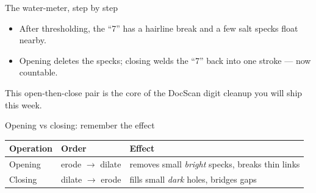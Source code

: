 \documentclass[10pt,aspectratio=169]{beamer}
\begin{document}
\begin{frame}{The water-meter, step by step}
  \begin{center}
  \end{center}
  \begin{itemize}
    \item After thresholding, the ``7'' has a hairline break and a few salt specks float nearby.
    \item Opening deletes the specks; closing welds the ``7'' back into one stroke — now countable.
  \end{itemize}
  \begin{goodbox}
    This open-then-close pair is the core of the DocScan digit cleanup you will ship this week.
  \end{goodbox}
\end{frame}

\begin{frame}{Opening vs closing: remember the effect}
  \begin{center}
  \begin{tabular}{@{}lll@{}}
    \toprule
    \textbf{Operation} & \textbf{Order} & \textbf{Effect} \\
    \midrule
    Opening & erode $\rightarrow$ dilate & removes small \emph{bright} specks, breaks thin links \\
    Closing & dilate $\rightarrow$ erode & fills small \emph{dark} holes, bridges gaps \\
    \bottomrule
  \end{tabular}
  \end{center}
\end{frame}

\end{document}
